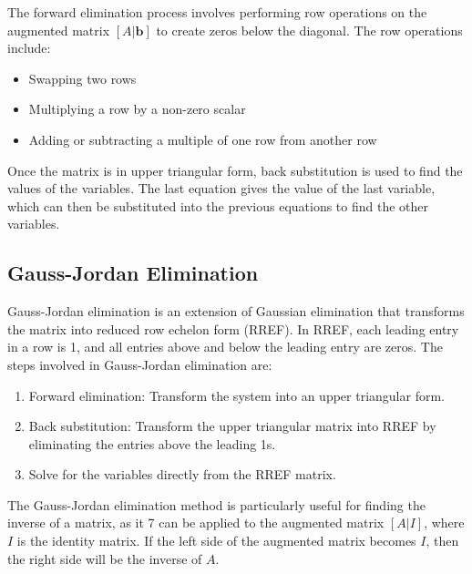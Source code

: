 The forward elimination process involves performing row operations on the augmented matrix 
\([A | \mathbf{b}]\) to create zeros below the diagonal. The row operations include:

\begin{itemize}

	\item Swapping two rows

	\item Multiplying a row by a non-zero scalar

	\item Adding or subtracting a multiple of one row from another row

\end{itemize}

Once the matrix is in upper triangular form, back substitution is used to find the values of the 
variables. The last equation gives the value of the last variable, which can then be substituted into 
the previous equations to find the other variables.

\subsection{Gauss-Jordan Elimination}

Gauss-Jordan elimination is an extension of Gaussian elimination that transforms the matrix into 
reduced row echelon form (RREF). In RREF, each leading entry in a row is 1, and all entries above and 
below the leading entry are zeros. The steps involved in Gauss-Jordan elimination are:

\begin{enumerate}

	\item Forward elimination: Transform the system into an upper triangular form.

	\item Back substitution: Transform the upper triangular matrix into RREF by eliminating the entries 
		  above the leading 1s.

	\item Solve for the variables directly from the RREF matrix.

\end{enumerate}

The Gauss-Jordan elimination method is particularly useful for finding the inverse of a matrix, as it 7
can be applied to the augmented matrix \([A | I]\), where \(I\) is the identity matrix. If the left side 
of the augmented matrix becomes \(I\), then the right side will be the inverse of \(A\).

